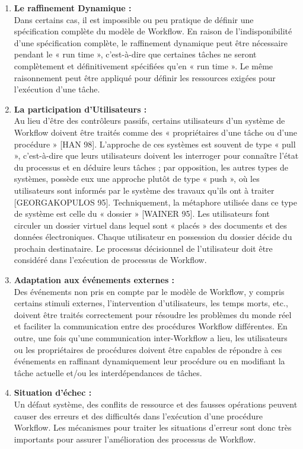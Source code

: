\begin{enumerate}

\item \textbf{Le raffinement Dynamique : }\\
Dans certains cas, il est impossible ou peu pratique de définir une spécification complète
du modèle de Workflow. En raison de l’indisponibilité d’une spécification complète, le raffinement dynamique peut être nécessaire pendant le « run time », c’est-à-dire que certaines tâches ne seront complètement et définitivement spécifiées qu’en « run time ». Le même raisonnement peut être appliqué pour définir les ressources exigées pour l’exécution d’une tâche. 

\item \textbf{La participation d’Utilisateurs : }\\
Au lieu d’être des contrôleurs passifs, certains utilisateurs d’un système de Workflow
doivent être traités comme des « propriétaires d’une tâche ou d’une procédure » [HAN 98].
L’approche de ces systèmes est souvent de type « pull », c’est-à-dire que leurs utilisateurs
doivent les interroger pour connaître l’état du processus et en déduire leurs tâches ; par opposition, les autres types de systèmes, possède eux une approche plutôt de type « push », où les
utilisateurs sont informés par le système des travaux qu’ils ont à traiter [GEORGAKOPULOS
95]. Techniquement, la métaphore utilisée dans ce type de système est celle du « dossier »
[WAINER 95]. Les utilisateurs font circuler un dossier virtuel dans lequel sont « placés » des
documents et des données électroniques. Chaque utilisateur en possession du dossier décide
du prochain destinataire. Le processus décisionnel de l’utilisateur doit être considéré dans
l’exécution de processus de Workflow. 

\item \textbf{Adaptation aux événements externes : }\\
Des événements non pris en compte par le modèle de Workflow, y compris certains stimuli externes, l’intervention d’utilisateurs, les temps morts, etc., doivent être traités correctement pour résoudre les problèmes du monde réel et faciliter la communication entre des procédures Workflow différentes. En outre, une fois qu’une communication inter-Workflow a
lieu, les utilisateurs ou les propriétaires de procédures doivent être capables de répondre à ces événements en raffinant dynamiquement leur procédure ou en modifiant la tâche actuelle
et/ou les interdépendances de tâches. 
\item \textbf{Situation d’échec : }\\
Un défaut système, des conflits de ressource et des fausses opérations peuvent causer des
erreurs et des difficultés dans l’exécution d’une procédure Workflow. Les mécanismes pour
traiter les situations d’erreur sont donc très importants pour assurer l’amélioration des processus de Workflow. 

\end{enumerate}
